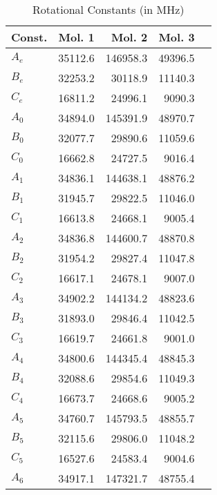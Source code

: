 \begin{table}
\centering
\caption{Rotational Constants (in MHz)}
\begin{tabular}{lrrrr}
Const. &          Mol. 1 &          Mol. 2 &          Mol. 3 \\
\hline
$A_{e    }$ &         35112.6 &        146958.3 &         49396.5 \\
$B_{e    }$ &         32253.2 &         30118.9 &         11140.3 \\
$C_{e    }$ &         16811.2 &         24996.1 &          9090.3 \\
$A_{0    }$ &         34894.0 &        145391.9 &         48970.7 \\
$B_{0    }$ &         32077.7 &         29890.6 &         11059.6 \\
$C_{0    }$ &         16662.8 &         24727.5 &          9016.4 \\
$A_{1    }$ &         34836.1 &        144638.1 &         48876.2 \\
$B_{1    }$ &         31945.7 &         29822.5 &         11046.0 \\
$C_{1    }$ &         16613.8 &         24668.1 &          9005.4 \\
$A_{2    }$ &         34836.8 &        144600.7 &         48870.8 \\
$B_{2    }$ &         31954.2 &         29827.4 &         11047.8 \\
$C_{2    }$ &         16617.1 &         24678.1 &          9007.0 \\
$A_{3    }$ &         34902.2 &        144134.2 &         48823.6 \\
$B_{3    }$ &         31893.0 &         29846.4 &         11042.5 \\
$C_{3    }$ &         16619.7 &         24661.8 &          9001.0 \\
$A_{4    }$ &         34800.6 &        144345.4 &         48845.3 \\
$B_{4    }$ &         32088.6 &         29854.6 &         11049.3 \\
$C_{4    }$ &         16673.7 &         24668.6 &          9005.2 \\
$A_{5    }$ &         34760.7 &        145793.5 &         48855.7 \\
$B_{5    }$ &         32115.6 &         29806.0 &         11048.2 \\
$C_{5    }$ &         16527.6 &         24583.4 &          9004.6 \\
$A_{6    }$ &         34917.1 &        147321.7 &         48755.4 \\

\end{tabular}
\end{table}
